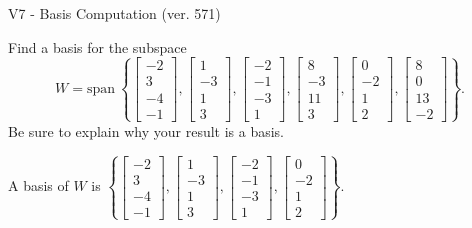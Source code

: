 \begin{exercise}
  \begin{exerciseTitle}V7 - Basis Computation (ver. 571)\end{exerciseTitle}
  \begin{exerciseStatement}
    Find a basis for the subspace 
\[W=\mathrm{span}\ \left\{\left[\begin{array}{r}
-2 \\
3 \\
-4 \\
-1
\end{array}\right] , \left[\begin{array}{r}
1 \\
-3 \\
1 \\
3
\end{array}\right] , \left[\begin{array}{r}
-2 \\
-1 \\
-3 \\
1
\end{array}\right] , \left[\begin{array}{r}
8 \\
-3 \\
11 \\
3
\end{array}\right] , \left[\begin{array}{r}
0 \\
-2 \\
1 \\
2
\end{array}\right] , \left[\begin{array}{r}
8 \\
0 \\
13 \\
-2
\end{array}\right]\right\}.\]
 Be sure to explain why your result is a basis.


  \end{exerciseStatement}
  \begin{exerciseAnswer}
   A basis of \(W\) is  \(\left\{\left[\begin{array}{r}
-2 \\
3 \\
-4 \\
-1
\end{array}\right] , \left[\begin{array}{r}
1 \\
-3 \\
1 \\
3
\end{array}\right] , \left[\begin{array}{r}
-2 \\
-1 \\
-3 \\
1
\end{array}\right] , \left[\begin{array}{r}
0 \\
-2 \\
1 \\
2
\end{array}\right]\right\}\).
  


  \end{exerciseAnswer}
\end{exercise}